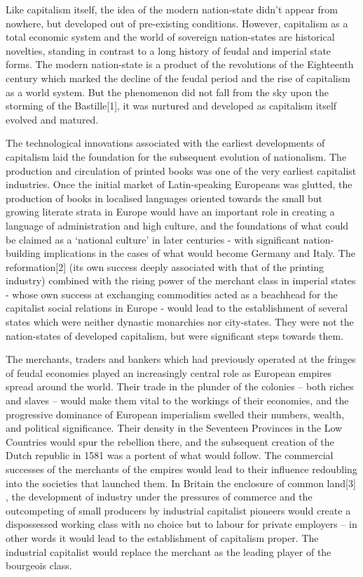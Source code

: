 Like capitalism itself, the idea of the modern nation-state didn’t appear from nowhere, but developed out of pre-existing conditions. However, capitalism as a total economic system and the world of sovereign nation-states are historical novelties, standing in contrast to a long history of feudal and imperial state forms. The modern nation-state is a product of the revolutions of the Eighteenth century which marked the decline of the feudal period and the rise of capitalism as a world system. But the phenomenon did not fall from the sky upon the storming of the Bastille[1], it was nurtured and developed as capitalism itself evolved and matured.

The technological innovations associated with the earliest developments of capitalism laid the foundation for the subsequent evolution of nationalism. The production and circulation of printed books was one of the very earliest capitalist industries. Once the initial market of Latin-speaking Europeans was glutted, the production of books in localised languages oriented towards the small but growing literate strata in Europe would have an important role in creating a language of administration and high culture, and the foundations of what could be claimed as a ‘national culture’ in later centuries - with significant nation-building implications in the cases of what would become Germany and Italy. The reformation[2] (its own success deeply associated with that of the printing industry) combined with the rising power of the merchant class in imperial states - whose own success at exchanging commodities acted as a beachhead for the capitalist social relations in Europe - would lead to the establishment of several states which were neither dynastic monarchies nor city-states. They were not the nation-states of developed capitalism, but were significant steps towards them.

The merchants, traders and bankers which had previously operated at the fringes of feudal economies played an increasingly central role as European empires spread around the world. Their trade in the plunder of the colonies – both riches and slaves – would make them vital to the workings of their economies, and the progressive dominance of European imperialism swelled their numbers, wealth, and political significance. Their density in the Seventeen Provinces in the Low Countries would spur the rebellion there, and the subsequent creation of the Dutch republic in 1581 was a portent of what would follow. The commercial successes of the merchants of the empires would lead to their influence redoubling into the societies that launched them. In Britain the enclosure of common land[3] , the development of industry under the pressures of commerce and the outcompeting of small producers by industrial capitalist pioneers would create a dispossessed working class with no choice but to labour for private employers – in other words it would lead to the establishment of capitalism proper. The industrial capitalist would replace the merchant as the leading player of the bourgeois class.


